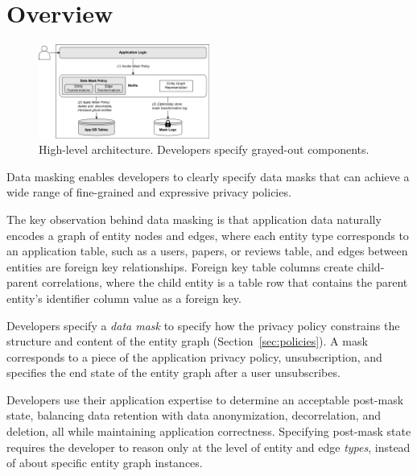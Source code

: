 \section{Overview}

\begin{figure}[t!]
    \centering
    \includegraphics[width=0.5\textwidth]{img/muffle}

    \caption{High-level \sys architecture. Developers specify grayed-out components.}
    \label{fig:arch}
\end{figure}

Data masking enables developers to clearly specify data masks that can achieve a wide range of
fine-grained and expressive privacy policies. 

The key observation behind data masking is that application data naturally encodes a graph of 
entity nodes and edges, where each entity type corresponds to an application table, such as a users,
papers, or reviews table, and edges between entities are foreign key relationships. Foreign key table
columns create child-parent correlations, where the child entity is a table row that contains the parent entity's
identifier column value as a foreign key. 

Developers specify a \emph{data mask} to specify how the privacy policy constrains the structure and
content of the entity graph (Section~\ref{sec:policies}). A mask corresponds to a piece of the
application privacy policy, \eg unsubscription, and specifies the end state of the entity graph
after a user unsubscribes. 

Developers use their application expertise to determine an acceptable post-mask state, balancing
data retention with data anonymization, decorrelation, and deletion, all while maintaining
application correctness.  Specifying post-mask state requires the developer to reason only at the
level of entity and edge \emph{types}, instead of about specific entity graph instances.
 
